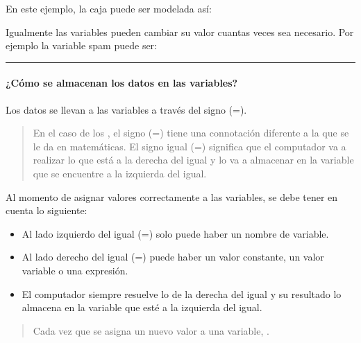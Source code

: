 \documentclass[letterpaper,10pt,spanish]{sphinxmanual}
\begin{document}
\sphinxAtStartPar
En este ejemplo, la caja puede ser modelada así:

\begin{sphinxVerbatim}[commandchars=\\\{\},numbers=left,firstnumber=1,stepnumber=1]
  
\end{sphinxVerbatim}

\sphinxAtStartPar
Igualmente las variables pueden cambiar su valor cuantas veces sea necesario. Por ejemplo la variable spam puede ser:

\begin{sphinxVerbatim}[commandchars=\\\{\},numbers=left,firstnumber=1,stepnumber=1]
  
  
  
  
\end{sphinxVerbatim}


\bigskip\hrule\bigskip



\paragraph{¿Cómo se almacenan los datos en las variables?}
\label{\detokenize{1_guias/10programacion/G1025:como-se-almacenan-los-datos-en-las-variables}}
\sphinxAtStartPar
Los datos se llevan a las variables a través del signo (=).
\begin{quote}

\sphinxAtStartPar
En el caso de los , el signo (=) tiene una connotación diferente a la que se le da en matemáticas. El signo igual (=) significa que el computador va a realizar lo que está a la derecha del igual y lo va a almacenar en la variable que se encuentre a la izquierda del igual.
\end{quote}

\sphinxAtStartPar
Al momento de asignar valores correctamente a las variables, se debe tener en cuenta lo siguiente:
\begin{itemize}
\item {} 
\sphinxAtStartPar
Al lado izquierdo del igual (=) solo puede haber un nombre de variable.

\item {} 
\sphinxAtStartPar
Al lado derecho del igual (=) puede haber un valor constante, un valor variable o una expresión.

\item {} 
\sphinxAtStartPar
El computador siempre resuelve lo de la derecha del igual y su resultado lo almacena en la variable que esté a la izquierda del igual.

\end{itemize}
\begin{quote}

\sphinxAtStartPar
Cada vez que se asigna un nuevo valor a una variable, .
\end{quote}
\end{document}
